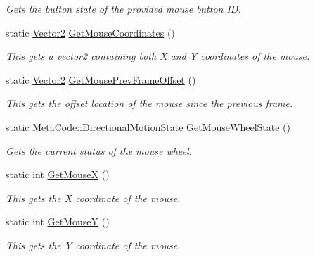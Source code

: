 \begin{DoxyCompactItemize}
\begin{DoxyCompactList}\small\item\em Gets the button state of the provided mouse button ID. \item\end{DoxyCompactList}\item 
static \hyperlink{classMezzanine_1_1Vector2}{Vector2} \hyperlink{classMezzanine_1_1InputQueryTool_a89407a5b1e3c727809581d367a25cdaf}{GetMouseCoordinates} ()
\begin{DoxyCompactList}\small\item\em This gets a vector2 containing both X and Y coordinates of the mouse. \item\end{DoxyCompactList}\item 
static \hyperlink{classMezzanine_1_1Vector2}{Vector2} \hyperlink{classMezzanine_1_1InputQueryTool_aeb184246219d3806f02f46acb1b7a719}{GetMousePrevFrameOffset} ()
\begin{DoxyCompactList}\small\item\em This gets the offset location of the mouse since the previous frame. \item\end{DoxyCompactList}\item 
static \hyperlink{classMezzanine_1_1MetaCode_ad37143a88b8c94cb6b2f40f5d66104ad}{MetaCode::DirectionalMotionState} \hyperlink{classMezzanine_1_1InputQueryTool_a9e48e986454ca65a43df76fd640defb4}{GetMouseWheelState} ()
\begin{DoxyCompactList}\small\item\em Gets the current status of the mouse wheel. \item\end{DoxyCompactList}\item 
static int \hyperlink{classMezzanine_1_1InputQueryTool_a2293a06cb2726b7f483c2b2c516071ba}{GetMouseX} ()
\begin{DoxyCompactList}\small\item\em This gets the X coordinate of the mouse. \item\end{DoxyCompactList}\item 
static int \hyperlink{classMezzanine_1_1InputQueryTool_a584fc35ad4333189f1e036c711c66fa7}{GetMouseY} ()
\begin{DoxyCompactList}\small\item\em This gets the Y coordinate of the mouse. \item\end{DoxyCompactList}\item 

\end{DoxyCompactItemize}
